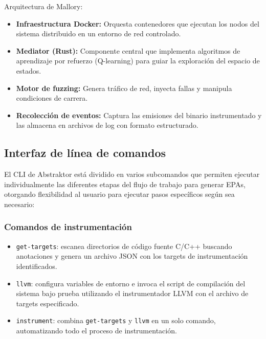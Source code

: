 \documentclass[12pt]{article}
\begin{document}
Arquitectura de Mallory:

\begin{itemize}
    \item \textbf{Infraestructura Docker:} Orquesta contenedores que ejecutan los nodos del sistema distribuido en un entorno de red controlado.
    
    \item \textbf{Mediator (Rust):} Componente central que implementa algoritmos de aprendizaje por refuerzo (Q-learning) para guiar la exploración del espacio de estados.
    
    \item \textbf{Motor de fuzzing:} Genera tráfico de red, inyecta fallas y manipula condiciones de carrera.
    
    \item \textbf{Recolección de eventos:} Captura las emisiones del binario instrumentado y las almacena en archivos de log con formato estructurado.
\end{itemize}

\subsection{Interfaz de línea de comandos}

El CLI de Abstraktor está dividido en varios subcomandos que permiten ejecutar individualmente las diferentes etapas del flujo de trabajo para generar EPAs, otorgando flexibilidad al usuario para ejecutar pasos específicos según sea necesario:

\subsubsection{Comandos de instrumentación}

\begin{itemize}
    \item \texttt{get-targets}: escanea directorios de código fuente C/C++ buscando anotaciones y genera un archivo JSON con los targets de instrumentación identificados.
    
    \item \texttt{llvm}: configura variables de entorno e invoca el script de compilación del sistema bajo prueba utilizando el instrumentador LLVM con el archivo de targets especificado.
    
    \item \texttt{instrument}: combina \texttt{get-targets} y \texttt{llvm} en un solo comando, automatizando todo el proceso de instrumentación.
\end{itemize}
\end{document}

